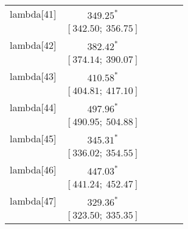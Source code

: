 \begin{table}
\begin{center}
\begin{tabular}{l c c c c c }
lambda[41]  & $349.25^{*}$                     &                           &                           &                         &                         \\
            & $[342.50;\ 356.75]$              &                           &                           &                         &                         \\
lambda[42]  & $382.42^{*}$                     &                           &                           &                         &                         \\
            & $[374.14;\ 390.07]$              &                           &                           &                         &                         \\
lambda[43]  & $410.58^{*}$                     &                           &                           &                         &                         \\
            & $[404.81;\ 417.10]$              &                           &                           &                         &                         \\
lambda[44]  & $497.96^{*}$                     &                           &                           &                         &                         \\
            & $[490.95;\ 504.88]$              &                           &                           &                         &                         \\
lambda[45]  & $345.31^{*}$                     &                           &                           &                         &                         \\
            & $[336.02;\ 354.55]$              &                           &                           &                         &                         \\
lambda[46]  & $447.03^{*}$                     &                           &                           &                         &                         \\
            & $[441.24;\ 452.47]$              &                           &                           &                         &                         \\
lambda[47]  & $329.36^{*}$                     &                           &                           &                         &                         \\
            & $[323.50;\ 335.35]$              &                           &                           &                         &                         \\

\end{tabular}
\end{center}
\end{table}
